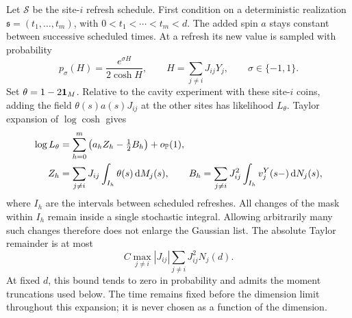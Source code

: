 Let $\mathcal S$ be the site-$i$ refresh schedule. First condition on
a deterministic realization $\mathfrak s=(t_1,\ldots,t_m)$, with
$0<t_1<\cdots<t_m<d$.  The added spin $a$ stays constant between
successive scheduled times.  At a refresh its new value is sampled with
probability
\[
 p_\sigma(H)=\frac{e^{\sigma H}}{2\cosh H},
 \qquad H=\sum_{j\ne i}J_{ij}Y_j,
 \qquad\sigma\in\{-1,1\}.
\]
Set $\theta=1-2\mathbf 1_M$.  Relative to the cavity experiment with these
site-$i$ coins, adding the field $\theta(s)a(s)J_{ij}$ at the other sites
has likelihood $L_\theta$.  Taylor expansion of $\log\cosh$ gives
\begin{align}
 \log L_\theta
 &=\sum_{h=0}^{m}\left(a_h Z_h-\tfrac12 B_h\right)+o_{\mathbb P}(1),
 \label{eq:row-score-expansion}\\
 Z_h&=\sum_{j\ne i}J_{ij}
                \int_{I_h}\theta(s)\,\mathrm d M_j(s),\qquad
 B_h=\sum_{j\ne i}J_{ij}^2
                \int_{I_h}v_j^Y(s-)\,\mathrm d N_j(s),
 \nonumber
\end{align}
where $I_h$ are the intervals between scheduled refreshes.  All changes
of the mask within $I_h$ remain inside a single stochastic integral.
Allowing arbitrarily many such changes therefore does not enlarge the
Gaussian list.  The absolute Taylor remainder is at most
\[
 C\max_{j\ne i}|J_{ij}|
       \sum_{j\ne i}J_{ij}^2N_j(d).
\]
At fixed $d$, this bound tends to zero in probability and admits the
moment truncations used below.  The time remains fixed before the
dimension limit throughout this expansion; it is never chosen as a
function of the dimension.

